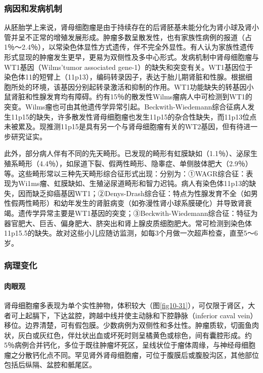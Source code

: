 \subsubsection{病因和发病机制}

从胚胎学上来说，肾母细胞瘤是由于持续存在的后肾胚基未能分化为肾小球及肾小管并呈不正常的增殖发展形成。肿瘤多数呈散发性，也有家族性病例的报道（占1％～2.4％），以常染色体显性方式遗传，伴不完全外显性。有人认为家族性遗传形式显现的肿瘤发生更早，更易为双侧性及多中心形式。发病机制中肾母细胞瘤与WT1基因（Wilms'tumor
associated
gene-1）的缺失和突变有关。WT1基因位于染色体11的短臂上（11p13），编码转录因子，表达于胎儿期肾脏和性腺。根据细胞所处的环境，该基因分别起转录激活和抑制的作用。WT1功能缺失的转基因小鼠肾脏和性腺发育均有障碍。约有15％的散发性Wilms瘤病人中可检测到WT1的突变。Wilms瘤也可由其他遗传学异常引起。Beckwith-Wiedemann综合征病人发生11p15的缺失，许多散发性肾母细胞瘤也发生11p15的杂合性缺失，而11p13位点未被累及。现推测11p15是具有另一个与肾母细胞瘤有关的WT2基因，但有待进一步研究证实。

此外，部分病人伴有不同的先天畸形。已发现的畸形有虹膜缺如（1.1％）、泌尿生殖系畸形（4.4％），如尿道下裂、假两性畸形、隐睾症、单侧肢体肥大（2.9％）等。这些畸形常以三种先天畸形综合征形式出现：分别为：①WAGR综合征：表现为Wi1ms瘤、虹膜缺如、生殖泌尿道畸形和智力迟钝。病人有染色体11p13的缺失，因而缺乏抑癌基因WT1；②Denys-Drash综合征：特点为性腺发育不全（如男性假两性畸形）和幼年发生的肾脏病变（如弥漫性肾小球系膜硬化）并导致肾衰竭。遗传学异常主要是WT1基因的突变；③Beckwith-Wiedemann综合征：特征为器官肥大、巨舌、偏身肥大、脐突出和肾上腺皮质细胞肥大。常可检测到染色体11p15.5的缺失。故对这些小儿应随访监测，如每3个月做一次超声检查，直至5～6岁。

\subsubsection{病理变化}

\paragraph{肉眼观}
肾母细胞瘤多表现为单个实性肿物，体积较大（图\ref{fig10-31}），可仅限于肾区，大者可上起膈下，下达盆腔，跨越中线并使主动脉和下腔静脉（inferior
caval
vein）移位。边界清楚，可有假包膜。少数病例为双侧性和多灶性。肿瘤质软，切面鱼肉状，灰白或灰红色，伴灶状出血或坏死时则呈橘黄色或棕色，间有囊腔形成。约5％病例合并钙化，多位于既往肿瘤坏死区，呈线状位于瘤体周缘，与神经母细胞瘤之分散钙化点不同。罕见肾外肾母细胞瘤，可位于腹膜后或腹股沟区，其他部位包括后纵隔、盆腔和骶尾区。

